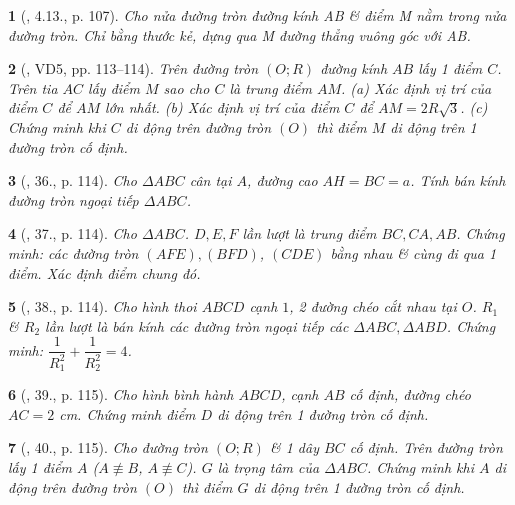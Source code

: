 \documentclass{article}
\newtheorem{baitoan}{}
\begin{document}
\begin{baitoan}[\cite{Binh_boi_duong_Toan_9_tap_1}, 4.13., p. 107]
	Cho nửa đường tròn đường kính AB \& điểm M nằm trong nửa đường tròn. Chỉ bằng thước kẻ, dựng qua M đường thẳng vuông góc với AB.
\end{baitoan}

\begin{baitoan}[\cite{Tuyen_Toan_9_old}, VD5, pp. 113--114]
	Trên đường tròn $(O;R)$ đường kính $AB$ lấy 1 điểm $C$. Trên tia $AC$ lấy điểm $M$ sao cho $C$ là trung điểm $AM$. (a) Xác định vị trí của điểm $C$ để $AM$ lớn nhất. (b) Xác định vị trí của điểm $C$ để $AM = 2R\sqrt{3}$. (c) Chứng minh khi $C$ di động trên đường tròn $(O)$ thì điểm $M$ di động trên 1 đường tròn cố định.
\end{baitoan}

\begin{baitoan}[\cite{Tuyen_Toan_9_old}, 36., p. 114]
	Cho $\Delta ABC$ cân tại $A$, đường cao $AH = BC = a$. Tính bán kính đường tròn ngoại tiếp $\Delta ABC$.
\end{baitoan}

\begin{baitoan}[\cite{Tuyen_Toan_9_old}, 37., p. 114]
	Cho $\Delta ABC$. $D,E,F$ lần lượt là trung điểm $BC,CA,AB$. Chứng minh: các đường tròn $(AFE),(BFD)$, $(CDE)$ bằng nhau \& cùng đi qua 1 điểm. Xác định điểm chung đó.
\end{baitoan}

\begin{baitoan}[\cite{Tuyen_Toan_9_old}, 38., p. 114]
	Cho hình thoi $ABCD$ cạnh $1$, 2 đường chéo cắt nhau tại $O$. $R_1$ \& $R_2$ lần lượt là bán kính các đường tròn ngoại tiếp các $\Delta ABC,\Delta ABD$. Chứng minh: $\dfrac{1}{R_1^2} + \dfrac{1}{R_2^2} = 4$.
\end{baitoan}

\begin{baitoan}[\cite{Tuyen_Toan_9_old}, 39., p. 115]
	Cho hình bình hành $ABCD$, cạnh $AB$ cố định, đường chéo $AC = 2$ \emph{cm}. Chứng minh điểm $D$ di động trên 1 đường tròn cố định.
\end{baitoan}

\begin{baitoan}[\cite{Tuyen_Toan_9_old}, 40., p. 115]
	Cho đường tròn $(O;R)$ \& 1 dây $BC$ cố định. Trên đường tròn lấy 1 điểm $A$ ($A\not\equiv B$, $A\not\equiv C$). $G$ là trọng tâm của $\Delta ABC$. Chứng minh khi $A$ di động trên đường tròn $(O)$ thì điểm $G$ di động trên 1 đường tròn cố định.
\end{baitoan}
\end{document}
